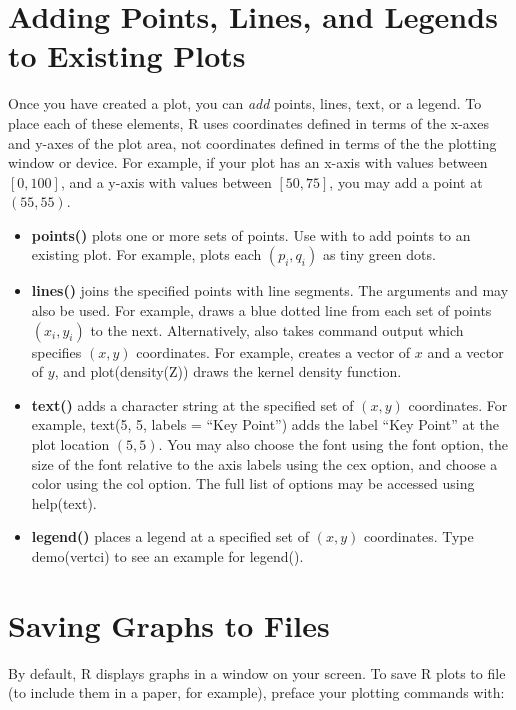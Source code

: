\documentclass[letterpaper,10pt,english]{sphinxmanual}
\begin{document}
\section{Adding Points, Lines, and Legends to Existing Plots}
\label{5_graphing_commands:adding-points-lines-and-legends-to-existing-plots}
Once you have created a plot, you can \emph{add} points, lines, text, or a
legend. To place each of these elements, R uses coordinates defined in
terms of the x-axes and y-axes of the plot area, not coordinates defined
in terms of the the plotting window or device. For example, if your plot
has an x-axis with values between \([0,
100]\), and a y-axis with values between \([50, 75]\), you may add a
point at \((55,55)\).
\begin{itemize}
\item {} 
\textbf{points()} plots one or more sets of points. Use  with
 to add points to an existing plot. For example,
 plots each
\((p_i, q_i)\) as tiny green dots.

\item {} 
\textbf{lines()} joins the specified points with line segments. The
arguments  and  may also be used. For example,
 draws a blue dotted line
from each set of points \((x_i, y_i)\) to the next.
Alternatively,  also takes command output which specifies
\((x, y)\) coordinates. For example,  creates a
vector of \(x\) and a vector of \(y\), and plot(density(Z))
draws the kernel density function.

\item {} 
\textbf{text()} adds a character string at the specified set of
\((x,y)\) coordinates. For example, text(5, 5, labels = “Key
Point”) adds the label “Key Point” at the plot location
\((5,5)\). You may also choose the font using the font option,
the size of the font relative to the axis labels using the cex
option, and choose a color using the col option. The full list of
options may be accessed using help(text).

\item {} 
\textbf{legend()} places a legend at a specified set of \((x,y)\)
coordinates. Type demo(vertci) to see an example for legend().

\end{itemize}


\section{Saving Graphs to Files}
\label{5_graphing_commands:saving-graphs-to-files}
By default, R displays graphs in a window on your screen. To save R
plots to file (to include them in a paper, for example), preface your
plotting commands with:
\end{document}
